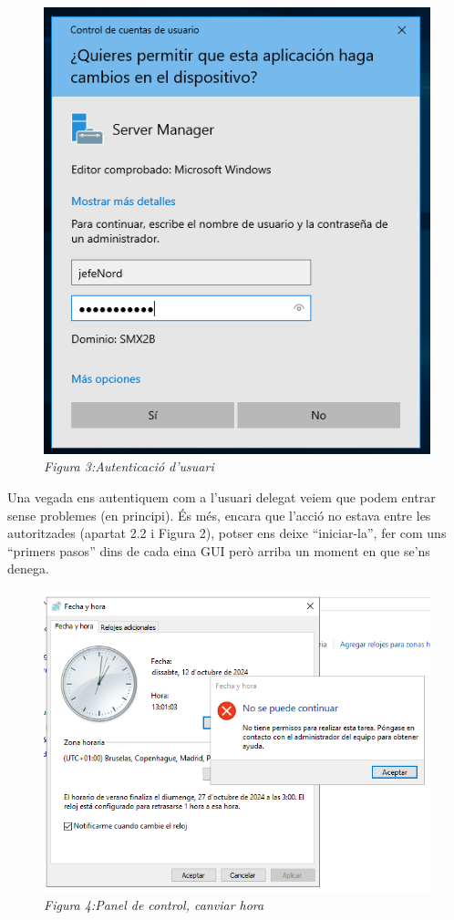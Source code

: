 \documentclass[
  a4paper,
]{article}
\begin{document}
\begin{figure}
\centering
\includegraphics{png/permisUsuariDelegat.png}
\caption{\emph{Figura 3:Autenticació d'usuari}}
\end{figure}

Una vegada ens autentiquem com a l'usuari delegat veiem que podem entrar
sense problemes (en principi). És més, encara que l'acció no estava
entre les autoritzades (apartat 2.2 i Figura 2), potser ens deixe
``iniciar-la'', fer com uns ``primers pasos'' dins de cada eina GUI però
arriba un moment en que se'ns denega.

\begin{figure}
\centering
\includegraphics{png/canviHoraNO.png}
\caption{\emph{Figura 4:Panel de control, canviar hora}}
\end{figure}
\end{document}
